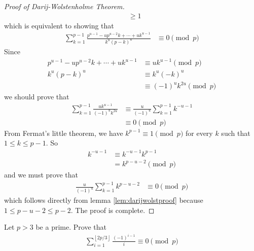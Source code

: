 \begin{proof}[Proof of Darij-Wolstenholme Theorem]
\begin{align*}
				& \geq 1
		\end{align*}
		which is equivalent to showing that
		\begin{align*}
			\sum_{k = 1}^{p - 1}\frac {p^{u - 1} - up^{u - 2}k+\cdots + uk^{u - 1}}{k^{u}(p-k)^{u}}
				& \equiv 0 \pmod p
		\end{align*}
		Since
			\begin{align*}
				p^{u - 1} - up^{u - 2}k+\cdots + uk^{u - 1}
					& \equiv uk^{u - 1} \pmod p\\
				k^{u}\left(p - k\right)^{u}
					& \equiv k^{u}\left(-k\right)^{u}\\
					& \equiv (-1)^u k^{2u} \pmod p
			\end{align*}
		we should prove that
			\begin{align*}
				\sum_{k = 1}^{p - 1}\frac {uk^{u - 1}}{\left( - 1\right)^{u}k^{2u}}
					& \equiv\frac {u}{\left( - 1\right)^{u}}\sum_{k = 1}^{p - 1}k^{ - u - 1}\\
					& \equiv 0 \pmod p
			\end{align*}
		From Fermat's little theorem, we have $k^{p-1} \equiv 1 \pmod p$ for every $k$ such that $1 \leq k \leq p-1$. So
			\begin{align*}
				k^{ - u - 1}
					& \equiv k^{ - u - 1}k^{p - 1}\\
					& = k^{p - u - 2}\pmod p
			\end{align*}
		and we must prove that
			\begin{align*}
				\frac {u}{\left( - 1\right)^{u}}\sum_{k = 1}^{p - 1}k^{p - u - 2}
					& \equiv 0 \pmod p
			\end{align*}
		which follows directly from lemma \eqref{lem:darijwolstproof} because $ 1\leq p - u - 2\leq p - 2$. The proof is complete.
	\end{proof}

	\begin{problem}
		Let $p>3$ be a prime. Prove that
		\begin{align*}
			\sum_{i = 1}^{\left\lfloor 2p/3\right\rfloor}\frac {\left( - 1\right)^{i - 1}}{i} \equiv 0 \pmod p
		\end{align*}
	\end{problem}

